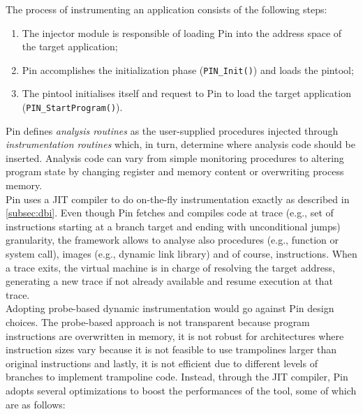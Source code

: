 \documentclass[LaM,binding=0.6cm]{sapthesis}
\begin{document}
The process of instrumenting an application consists of the following steps:
\begin{enumerate}
\item The injector module is responsible of loading Pin into the address space of the target application;
\item Pin accomplishes the initialization phase (\texttt{PIN\_Init()}) and loads the pintool;
\item The pintool initialises itself and request to Pin to load the target application (\texttt{PIN\_StartProgram()}).
\end{enumerate}
Pin defines \textit{analysis routines} as the user-supplied procedures injected through \textit{instrumentation routines} which, in turn, determine where analysis code should be inserted. Analysis code can vary from simple monitoring procedures to altering program state by changing register and memory content or overwriting process memory.\\
Pin uses a JIT compiler to do on-the-fly instrumentation exactly as described in \autoref{subsec:dbi}. Even though Pin fetches and compiles code at trace (e.g., set of instructions starting at a branch target and ending with unconditional jumps) granularity, the framework allows to analyse also procedures (e.g., function or system call), images (e.g., dynamic link library) and of course, instructions. When a trace exits, the virtual machine is in charge of resolving the target address, generating a new trace if not already available and resume execution at that trace.\\
Adopting probe-based dynamic instrumentation would go against Pin design choices. The probe-based approach is not transparent because program instructions are overwritten in memory, it is not robust for architectures where instruction sizes vary because it is not feasible to use trampolines larger than original instructions and lastly, it is not efficient due to different levels of branches to implement trampoline code. Instead, through the JIT compiler, Pin adopts several optimizations to boost the performances of the tool, some of which are as follows:
\end{document}
